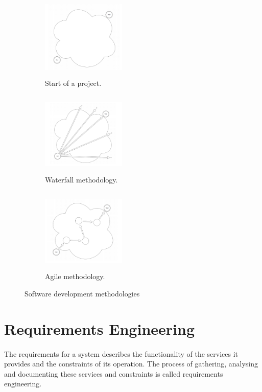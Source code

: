 \documentclass{l4proj}
\begin{document}
\begin{figure}[H]
\begin{subfigure}{.3\textwidth}
	\centering
	\includegraphics[height=4cm,width=4cm]{images/projectInitial}
	\caption{Start of a project.}
	\label{projectInitial}
\end{subfigure}
\begin{subfigure}{.3\textwidth}
	\centering
	\includegraphics[height=4cm,width=4cm]{images/projectStart}
	\caption{Waterfall methodology.}
	\label{projectStart}
\end{subfigure}
\begin{subfigure}{.3\textwidth}
	\centering
	\includegraphics[height=4cm,width=4cm]{images/projectAgile}
	\caption{Agile methodology.}
	\label{projectAgile}
\end{subfigure}
\caption{Software development methodologies}
\end{figure}



\section{Requirements Engineering}
\paragraph{}
The requirements for a system describes the functionality of the services it provides and the constraints of its operation. The process of gathering, analysing and documenting these services and constraints is called requirements engineering.
\end{document}
